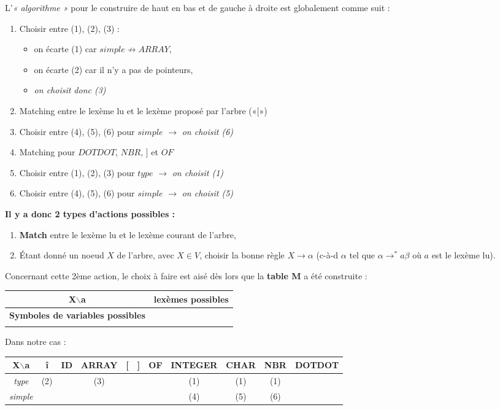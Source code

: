 \documentclass{article}
\begin{document}
\noindent L'\textit{« algorithme »} pour le construire de haut en bas et de gauche à droite est globalement comme suit :
\begin{enumerate}
\item Choisir entre (1), (2), (3) : 
	\begin{itemize}
		\item on écarte (1) car $simple \not\rightarrow ARRAY$,
		\item on écarte (2) car il n'y a pas de pointeurs,
		\item \textit{on choisit donc (3)}
	\end{itemize}
\item Matching entre le lexème lu et le lexème proposé par l'arbre («$[$»)
\item Choisir entre (4), (5), (6) pour $simple$ $\rightarrow$ \textit{on choisit (6)}
\item Matching pour $DOTDOT$, $NBR$, $]$ et $OF$
\item Choisir entre (1), (2), (3) pour $type$ $\rightarrow$ \textit{on choisit (1)}
\item Choisir entre (4), (5), (6) pour $simple$ $\rightarrow$ \textit{on choisit (5)} \\
\end{enumerate}

\noindent \textbf{Il y a donc 2 types d'actions possibles :}
\begin{enumerate}
\item \textbf{Match} entre le lexème lu et le lexème courant de l'arbre,
\item Étant donné un noeud $X$ de l'arbre, avec $X \in V$, choisir la bonne règle $X\rightarrow \alpha$ (c-à-d $\alpha$ tel que $\alpha \rightarrow^* a\beta$ où $a$ est le 
lexème lu).
\end{enumerate}

Concernant cette 2ème action, le choix à faire est aisé dès lors que la \textbf{table M} a été construite : 
\begin{center}
\begin{tabular}{c|c}
\textbf{X$\backslash$a} & \textbf{lexèmes possibles} \\
\hline
\textbf{Symboles de variables possibles} & \\
 & \\
\end{tabular}
\end{center}
\newpage
\noindent Dans notre cas : 

\begin{center}
	\begin{tabular}{*{10}{c|}c}
	\textbf{X$\backslash$a} & î & ID & ARRAY & [ & ] & OF & INTEGER & CHAR & NBR & DOTDOT \\
	\hline
	\textit{type} & (2) & & (3) & & & & (1) & (1) & (1) & \\
	\hline
	\textit{simple} & & & & & & & (4) & (5) & (6) & \\
	\end{tabular}
\end{center}
\end{document}
